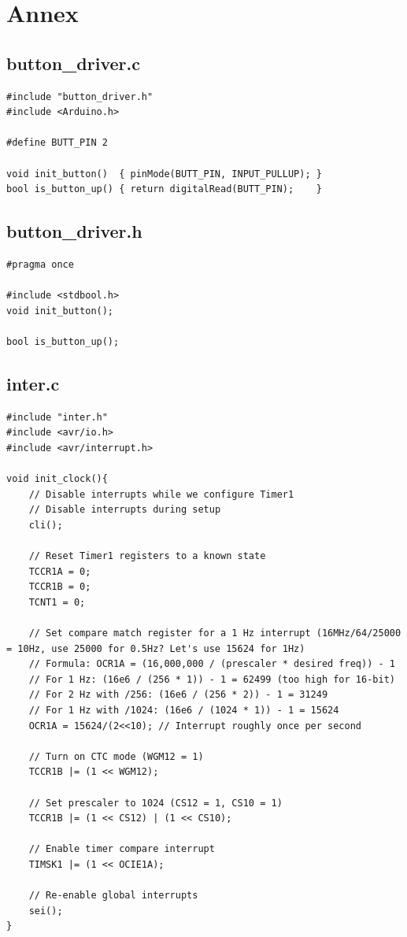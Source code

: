 \documentclass[12pt,a4paper]{article}
\begin{document}
\newpage
\section{Annex}

\subsection{ button\_driver.c }
\begin{lstlisting}
#include "button_driver.h"
#include <Arduino.h>

#define BUTT_PIN 2

void init_button()  { pinMode(BUTT_PIN, INPUT_PULLUP); }
bool is_button_up() { return digitalRead(BUTT_PIN);    }
\end{lstlisting}

\subsection{button\_driver.h}
\begin{lstlisting}
#pragma once

#include <stdbool.h>
void init_button();

bool is_button_up();
\end{lstlisting}

\subsection{inter.c}
\begin{lstlisting}
#include "inter.h"
#include <avr/io.h>
#include <avr/interrupt.h>

void init_clock(){
	// Disable interrupts while we configure Timer1
	// Disable interrupts during setup
	cli();

	// Reset Timer1 registers to a known state
	TCCR1A = 0;
	TCCR1B = 0;
	TCNT1 = 0;

	// Set compare match register for a 1 Hz interrupt (16MHz/64/25000 = 10Hz, use 25000 for 0.5Hz? Let's use 15624 for 1Hz)
	// Formula: OCR1A = (16,000,000 / (prescaler * desired freq)) - 1
	// For 1 Hz: (16e6 / (256 * 1)) - 1 = 62499 (too high for 16-bit)
	// For 2 Hz with /256: (16e6 / (256 * 2)) - 1 = 31249
	// For 1 Hz with /1024: (16e6 / (1024 * 1)) - 1 = 15624
	OCR1A = 15624/(2<<10); // Interrupt roughly once per second

	// Turn on CTC mode (WGM12 = 1)
	TCCR1B |= (1 << WGM12);

	// Set prescaler to 1024 (CS12 = 1, CS10 = 1)
	TCCR1B |= (1 << CS12) | (1 << CS10);

	// Enable timer compare interrupt
	TIMSK1 |= (1 << OCIE1A);

	// Re-enable global interrupts
	sei();
}
\end{lstlisting}
\end{document}
